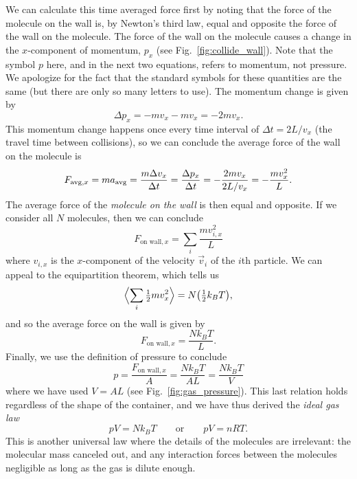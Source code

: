 We can calculate this time averaged force first by noting that the force
of the molecule on the wall is, by Newton's third law, equal and opposite
the force of the wall on the molecule.  The force of the wall on the molecule
causes a change in the $x$-component of momentum, $p_x$ (see 
Fig.~\ref{fig:collide_wall}).  Note that the symbol $p$ here, and in the 
next two equations,  refers to momentum, not pressure. We apologize for 
the fact that the standard symbols for these quantities are the same
(but there are only so many letters to use).  The momentum change is 
given by 
\begin{equation}
\Delta  p_x  = - mv_x - m v_x = -2mv_x.
\end{equation}
This momentum change happens once every time interval of $\Delta t =
2L/v_x$ (the travel time between collisions), so we can conclude the
average force of the wall on the molecule is
\begin{equation}
F_{{\rm avg},x} = m a_\text{avg}= \frac{m \Delta v_x}{\Delta t} =\frac{\Delta p_x}{\Delta t} = -\frac{2mv_x}{2L/v_x} =
-\frac{mv_x^2}{L}.
\end{equation}
The average force of the {\it molecule on the wall} is then
equal and opposite.  If we consider all $N$ molecules, then we can
conclude
\begin{equation}
F_{\text{on wall},x} = \sum_i \frac{m v_{i,x}^2}{L}
\end{equation}
where $v_{i,x}$ is the $x$-component of the velocity $\vec v_i$ of the
$i$th particle.
We can appeal to the equipartition theorem, which tells us
\begin{equation}
\Bigl\langle\sum_i {\textstyle\frac{1}{2}} m v_x^2\Bigr\rangle = N
\bigl({\textstyle\frac{1}{2}}k_BT\bigr),
\end{equation}
and so the average force on the wall is given by
\begin{equation}
F_{\text{on wall},x} = \frac{Nk_BT}{L}.
\end{equation}
Finally, we use the definition of pressure to conclude
\begin{equation}
p = \frac{F_{\text{on wall},x}}{A} = \frac{Nk_BT}{AL} = \frac{Nk_BT}{V}
\end{equation}
where we have used $V=AL$ (see Fig.~\ref{fig:gas_pressure}).  This
last relation holds regardless of the shape of the container, and we
have thus derived the {\it ideal gas law}
\begin{equation}
pV = N k_BT \qquad \text{or}\qquad pV = nRT.
\label{eq:ideal_gas_law}
\end{equation}
This is another universal law where the details of the molecules are
irrelevant: the molecular mass canceled out, and any interaction
forces between the molecules negligible as long as the gas is dilute
enough.

